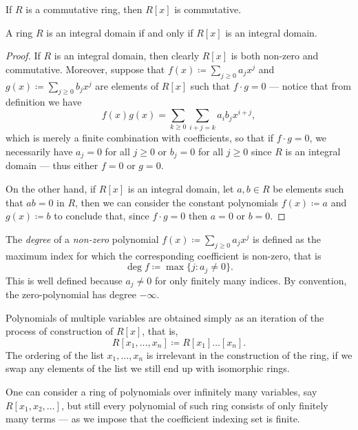 %
\begin{corollary}
\label{cor:ring-R[x]-inherits-commutativity}
If \(R\) is a commutative ring, then \(R[x]\) is commutative.
\end{corollary}
%

%
\begin{lemma}
\label{lem:ring-R[x]-inherits-integral-domain}
A ring \(R\) is an integral domain if and only if \(R[x]\) is an integral
domain.
\end{lemma}
%

%
\begin{proof}
If \(R\) is an integral domain, then clearly \(R[x]\) is both non-zero and
commutative. Moreover, suppose that \(f(x) \coloneq \sum_{j \geq 0} a_j x^j\)
and \(g(x) \coloneq \sum_{j \geq 0} b_j x^j\) are elements of \(R[x]\) such that
\(f \cdot g = 0\) --- notice that from definition we have
\[
  f(x) g(x) = \sum_{k \geq 0} \sum_{i + j = k} a_i b_j x^{i + j},
\]
which is merely a finite combination with coefficients, so that if
\(f \cdot g = 0\), we necessarily have \(a_j = 0\) for all \(j \geq 0\) or
\(b_j = 0\) for all \(j \geq 0\) since \(R\) is an integral domain --- thus
either \(f = 0\) or \(g = 0\).

On the other hand, if \(R[x]\) is an integral domain, let \(a, b \in R\) be
elements such that \(a b = 0\) in \(R\), then we can consider the constant
polynomials \(f(x) \coloneq a\) and \(g(x) \coloneq b\) to conclude that, since
\(f \cdot g = 0\) then \(a = 0\) or \(b = 0\).
\end{proof}
%

%
\begin{definition}
\label{def:degree-polynomial}
The \emph{degree} of a \emph{non-zero} polynomial
\(f(x) \coloneq \sum_{j \geq 0} a_j x^j\) is defined as the maximum index for
which the corresponding coefficient is non-zero, that is
\[
  \deg f \coloneq \max \{j \colon a_j \neq 0\}.
\]
This is well defined because \(a_j \neq 0\) for only finitely many indices.
By convention, the zero-polynomial has degree \(-\infty\).
\end{definition}
%

Polynomials of multiple variables are obtained simply as an iteration of the
process of construction of \(R[x]\), that is,
\[
  R[x_1, \dots, x_n] \coloneq R[x_1] \dots [x_n].
\]
The ordering of the list \(x_1, \dots, x_n\) is irrelevant in the construction
of the ring, if we swap any elements of the list we still end up with isomorphic
rings.

One can consider a ring of polynomials over infinitely many variables, say
\(R[x_1, x_2, \dots]\), but still every polynomial of such ring consists of only
finitely many terms --- as we impose that the coefficient indexing set is
finite.

